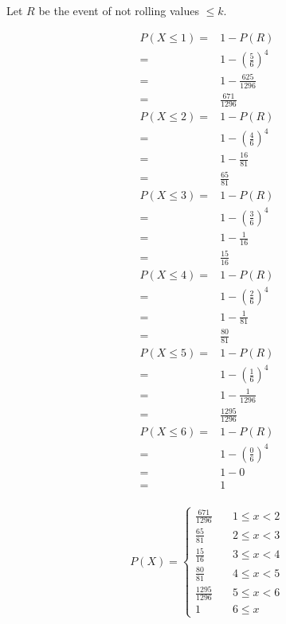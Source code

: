 \documentclass[12pt]{article}%
\begin{document}
Let $R$ be the event of not rolling values $\leq k$.
\begin{fleqn}[\parindent]
\begin{equation*}
\begin{split}
P(X\leq1) = & 1 - P(R) \\
		  = & 1 - (\frac{5}{6})^4 \\
		  = & 1 - \frac{625}{1296} \\
		  = & \frac{671}{1296} \\
P(X\leq2) = & 1 - P(R) \\
		  = & 1 - (\frac{4}{6})^4 \\
		  = & 1 - \frac{16}{81} \\
		  = & \frac{65}{81} \\
P(X\leq3) = & 1 - P(R) \\
		  = & 1 - (\frac{3}{6})^4 \\
		  = & 1 - \frac{1}{16} \\
		  = & \frac{15}{16} \\
P(X\leq4) = & 1 - P(R) \\
		  = & 1 - (\frac{2}{6})^4 \\
		  = & 1 - \frac{1}{81} \\
		  = & \frac{80}{81} \\
P(X\leq5) = & 1 - P(R) \\
		  = & 1 - (\frac{1}{6})^4 \\
		  = & 1 - \frac{1}{1296} \\
		  = & \frac{1295}{1296} \\
P(X\leq6) = & 1 - P(R) \\
		  = & 1 - (\frac{0}{6})^4 \\
		  = & 1 - 0 \\
		  = & 1 \\
\end{split}
\end{equation*}
\end{fleqn}



\[ P(X) =
  \begin{cases}
    \frac{671}{1296}     & \quad 1 \leq x < 2 \\
    \frac{65}{81} 	  	  & \quad 2 \leq x < 3 \\
  	\frac{15}{16}  	  	  & \quad 3 \leq x < 4 \\
    \frac{80}{81}     & \quad 4 \leq x < 5 \\
    \frac{1295}{1296}     & \quad 5 \leq x < 6 \\
    1     & \quad 6 \leq x 
  \end{cases}
\]
\end{document}

